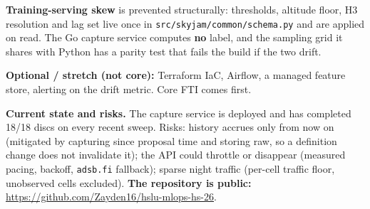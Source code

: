 \documentclass[10pt,a4paper]{article}
\newcommand{\repo}{https://github.com/Zayden16/hslu-mlops-hs-26}
\newcommand{\code}[1]{\texttt{#1}}
\begin{document}
\textbf{Training-serving skew} is prevented structurally: thresholds, altitude floor,
H3 resolution and lag set live once in \code{src/skyjam/common/schema.py} and are applied on
read. The Go capture service computes \textbf{no} label, and the sampling grid it shares with
Python has a parity test that fails the build if the two drift.

\textbf{Optional / stretch (not core):} Terraform IaC, Airflow, a managed feature store,
alerting on the drift metric. Core FTI comes first.

\textbf{Current state and risks.} The capture service is deployed and has completed 18/18
discs on every recent sweep. Risks: history accrues only from now on (mitigated by capturing
since proposal time and storing raw, so a definition change does not invalidate it); the API
could throttle or disappear (measured pacing, backoff, \code{adsb.fi} fallback); sparse night
traffic (per-cell traffic floor, unobserved cells excluded). \textbf{The repository is public:}
\url{\repo}.
\end{document}
